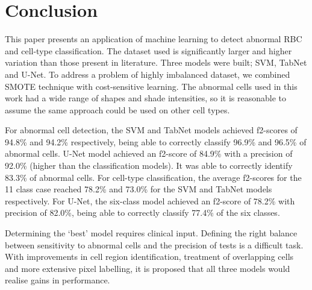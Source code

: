 \documentclass[final,5p,times,twocolumn,authoryear]{elsarticle}
\begin{document}
\section{Conclusion}
\label{chap:conc}
This paper presents an application of machine learning to detect abnormal RBC and cell-type classification. The dataset used is significantly larger and higher variation than those present in literature.
Three models were built; SVM, TabNet and U-Net. To address a problem of highly imbalanced dataset, we combined SMOTE technique with cost-sensitive learning. The abnormal cells used in this work had a wide range of shapes and shade intensities, so it is reasonable to assume the same approach could be used on other cell types.

For abnormal cell detection, the SVM and TabNet models achieved f2-scores of 94.8\%  and 94.2\% respectively, being able to correctly classify 96.9\%  and 96.5\% of abnormal cells. U-Net model achieved an f2-score of 84.9\% with a precision of 92.0\% (higher than the classification models). It was able to correctly identify 83.3\% of abnormal cells. For cell-type classification, the average f2-scores for the 11 class case reached 78.2\% and 73.0\% for the SVM and TabNet models respectively. For U-Net, the six-class model achieved an f2-score of 78.2\% with precision of 82.0\%, being able to correctly classify 77.4\% of the six classes.

Determining the `best' model requires clinical input. Defining the right balance between sensitivity to abnormal cells and the precision of tests is a difficult task. With improvements in cell region identification, treatment of overlapping cells and more extensive pixel labelling, it is proposed that all three models would realise gains in performance.

 






\end{document}
